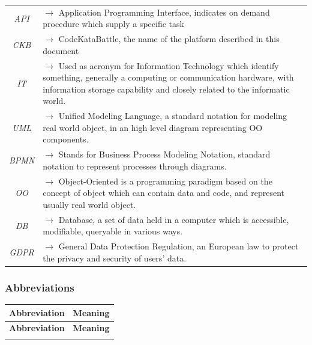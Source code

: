\documentclass{article}
\begin{document}
{\begin{xltabular}{\textwidth}{ >{\raggedright\arraybackslash}c >{\raggedright\arraybackslash}X }
    \textit{API} & $\rightarrow$ Application Programming Interface, indicates on demand procedure which supply a specific task
    \\
    \textit{CKB} & $\rightarrow$ CodeKataBattle, the name of the platform described in this document
    \\
    \textit{IT} & $\rightarrow$ Used as acronym for Information Technology which identify something, generally a computing or communication hardware, with information storage capability and closely related to the informatic world.
    \\
    \textit{UML} & $\rightarrow$ Unified Modeling Language, a standard notation for modeling real world object, in an high level diagram representing OO components.
    \\
    \textit{BPMN} & $\rightarrow$ Stands for Business Process Modeling Notation, standard notation to represent processes through diagrams.
    \\
    \textit{OO} & $\rightarrow$ Object-Oriented is a programming paradigm based on the concept of object which can contain data and code, and represent usually real world object.
    \\
    \textit{DB} & $\rightarrow$ Database, a set of data held in a computer which is accessible, modifiable, queryable in various ways.
    \\
    \textit{GDPR} & $\rightarrow$ General Data Protection Regulation, an European law to protect the privacy and security of users' data.
\end{xltabular}


\subsubsection{Abbreviations}
\begin{xltabular}{\textwidth}{ >{\raggedright\arraybackslash}c >{\raggedright\arraybackslash}X }
    \hline
    \textbf{Abbreviation} & \textbf{Meaning} \\
    \hline

    \endfirsthead

    \hline
    \textbf{Abbreviation} & \textbf{Meaning} \\
    \hline

    \endhead
    \endfoot
    \endlastfoot


\end{xltabular}}
\end{document}
